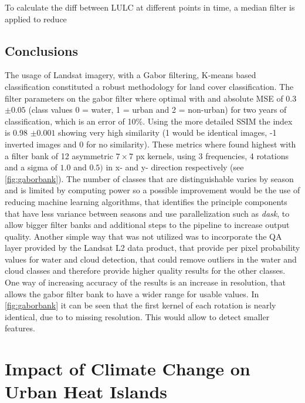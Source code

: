 \documentclass[12pt,a4paper, english,twoside]{scrartcl}
\begin{document}
      \noindent
      To calculate the diff between \gls{LULC} at different points in time, a median filter is applied to reduce
      
 \subsection{Conclusions}

    The usage of Landsat imagery, with a Gabor filtering, K-means based classification constituted a robust methodology for land cover classification.
    The filter parameters on the gabor filter where optimal with and absolute MSE of 0.3 $\pm 0.05$ (class values 0 = water, 1 = urban and 2 = non-urban) for two years of classification, which is an error of 10\%.
    Using the more detailed \gls{SSIM} the index is 0.98 $\pm 0.001$ showing very high similarity (1 would be identical images, -1 inverted images and 0 for no similarity). 
    These metrics where found highest with a filter bank of 12 asymmetric $7\times7$ px kernels, using 3 frequencies, 4 rotations and a sigma of $1.0$ and $0.5)$ in x- and y- direction respectively (see \cref{fig:gaborbank}).
    The number of classes that are distinguishable varies by season and is limited by computing power so a possible improvement would be the use of reducing machine learning algorithms, that identifies the principle components that have less variance between seasons and use parallelization such as \textit{dask}\autocite{dask}, to allow bigger filter banks and additional steps to the pipeline to increase output quality.
    Another simple way that was not utilized was to incorporate the QA layer provided by the Landsat L2 data product, that provide per pixel probability values for water and cloud detection, that could remove outliers in the water and cloud classes and therefore provide higher quality results for the other classes. 
    One way of increasing accuracy of the results is an increase in resolution, that allows the gabor filter bank to have a wider range for usable values. 
    In \cref{fig:gaborbank} it can be seen that the first kernel of each rotation is nearly identical, due to to missing resolution. 
    This would allow to detect smaller features.
    
  \newpage
  \section{Impact of Climate Change on Urban Heat Islands}\label{sec:UHITempImp}
\end{document}
